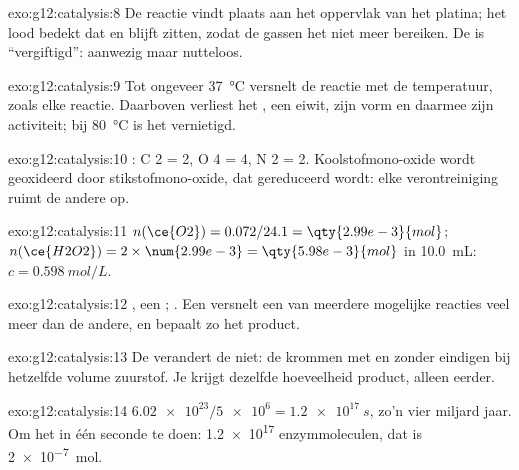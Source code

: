 \begin{solution}{exo:g12:catalysis:8}
De reactie vindt plaats aan het oppervlak van het platina; het lood
bedekt dat en blijft zitten, zodat de gassen het  niet meer
bereiken. De  is ``vergiftigd'': aanwezig maar nutteloos.
\end{solution}

\begin{solution}{exo:g12:catalysis:9}
Tot ongeveer \qty{37}{\celsius} versnelt de reactie met de temperatuur,
zoals elke reactie. Daarboven verliest het , een eiwit, zijn vorm en
daarmee zijn activiteit; bij \qty{80}{\celsius} is het vernietigd.
\end{solution}

\begin{solution}{exo:g12:catalysis:10}
: C 2 = 2, O 4 = 4, N 2 = 2. Koolstofmono-oxide
wordt geoxideerd door stikstofmono-oxide, dat gereduceerd wordt: elke
verontreiniging ruimt de andere op.
\end{solution}

\begin{solution}{exo:g12:catalysis:11}
$n(\ce{O2}) = 0.072 / 24.1 = \qty{2.99e-3}{mol}$;
$n(\ce{H2O2}) = 2 \times \num{2.99e-3} = \qty{5.98e-3}{mol}$ in
\qty{10.0}{mL}: $c = \qty{0.598}{mol/L}$.
\end{solution}

\begin{solution}{exo:g12:catalysis:12}
, een ; .
Een  versnelt een van meerdere mogelijke reacties
veel meer dan de andere, en bepaalt zo het product.
\end{solution}

\begin{solution}{exo:g12:catalysis:13}
De  verandert de  niet: de krommen met en zonder
 eindigen bij hetzelfde volume zuurstof. Je krijgt dezelfde
hoeveelheid product, alleen eerder.
\end{solution}

\begin{solution}{exo:g12:catalysis:14}
$\num{6.02e23} / \num{5e6} = \qty{1.2e17}{s}$, zo'n vier miljard jaar.
Om het in één seconde te doen: \num{1.2e17} enzymmoleculen, dat is
\qty{2e-7}{mol}.
\end{solution}

